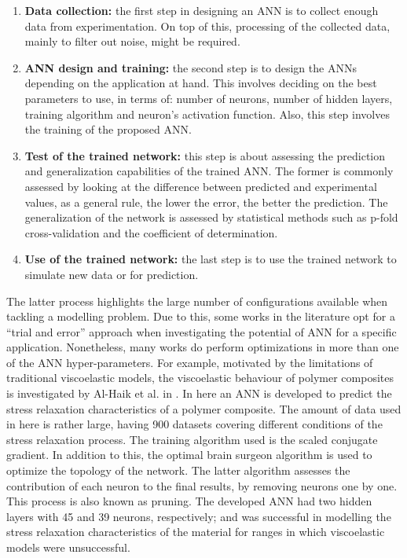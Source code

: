 \begin{enumerate}
    \item \textbf{Data collection:} the first step in designing an ANN is to collect enough data from experimentation. On top of this, processing of the collected data, mainly to filter out noise, might be required.
    \item \textbf{ANN design and training:} the second step is to design the ANNs depending on the application at hand. This involves deciding on the best parameters to use, in terms of: number of neurons, number of hidden layers, training algorithm and neuron's activation function. Also, this step involves the training of the proposed ANN.
    \item \textbf{Test of the trained network:} this step is about assessing the prediction and generalization capabilities of the trained ANN. The former is commonly assessed by looking at the difference between predicted and experimental values, as a general rule, the lower the error, the better the prediction. The generalization of the network is assessed by statistical methods such as p-fold cross-validation and the coefficient of determination.
    \item \textbf{Use of the trained network:} the last step is to use the trained network to simulate new data or for prediction.
\end{enumerate}

The latter process highlights the large number of configurations available when tackling a modelling problem. Due to this, some works in the literature opt for a ``trial and error'' approach when investigating the potential of ANN for a specific application. Nonetheless, many works do perform optimizations in more than one of the ANN hyper-parameters. For example, motivated by the limitations of traditional viscoelastic models, the viscoelastic behaviour of polymer composites is investigated by Al-Haik et al. in \cite{al2006prediction}. In here an ANN is developed to predict the stress relaxation characteristics of a polymer composite. The amount of data used in here is rather large, having 900 datasets covering different conditions of the stress relaxation process. The training algorithm used is the scaled conjugate gradient. In addition to this, the optimal brain surgeon algorithm is used to optimize the topology of the network. The latter algorithm assesses the contribution of each neuron to the final results, by removing neurons one by one. This process is also known as pruning. The developed ANN had two hidden layers with 45 and 39 neurons, respectively; and was successful in modelling the stress relaxation characteristics of the material for ranges in which viscoelastic models were unsuccessful.

